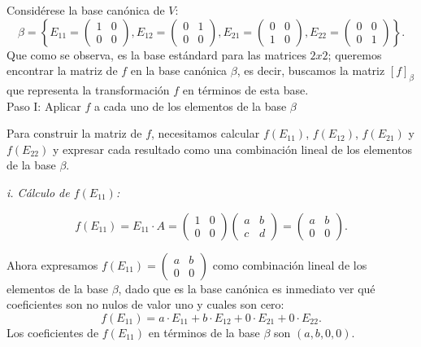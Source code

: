 \documentclass{article}
\begin{document}
Considérese la base canónica de \( V \):
\[
\beta = \left\{ E_{11} = \begin{pmatrix} 1 & 0 \\ 0 & 0 \end{pmatrix}, E_{12} = \begin{pmatrix} 0 & 1 \\ 0 & 0 \end{pmatrix}, E_{21} = \begin{pmatrix} 0 & 0 \\ 1 & 0 \end{pmatrix}, E_{22} = \begin{pmatrix} 0 & 0 \\ 0 & 1 \end{pmatrix} \right\}.
\]
Que como se observa, es la base estándard para las matrices $2x2$; queremos encontrar la matriz de \( f \) en la base canónica \( \beta \), es decir, buscamos la matriz \( [f]_\beta \) que representa la transformación \( f \) en términos de esta base.\\

Paso I: Aplicar \( f \) a cada uno de los elementos de la base \( \beta \)

Para construir la matriz de \( f \), necesitamos calcular \( f(E_{11}) \), \( f(E_{12}) \), \( f(E_{21}) \) y \( f(E_{22}) \) y expresar cada resultado como una combinación lineal de los elementos de la base \( \beta \).

\textit{i. Cálculo de \( f(E_{11}) \):}

   \[
   f(E_{11}) = E_{11} \cdot A = \begin{pmatrix} 1 & 0 \\ 0 & 0 \end{pmatrix} \begin{pmatrix} a & b \\ c & d \end{pmatrix} = \begin{pmatrix} a & b \\ 0 & 0 \end{pmatrix}.
   \]

   Ahora expresamos \( f(E_{11}) = \begin{pmatrix} a & b \\ 0 & 0 \end{pmatrix} \) como combinación lineal de los elementos de la base \( \beta \), dado que es la base canónica es inmediato ver qué coeficientes son no nulos de valor uno y cuales son cero:
   \[
   f(E_{11}) = a \cdot E_{11} + b \cdot E_{12} + 0 \cdot E_{21} + 0 \cdot E_{22}.
   \]
   Los coeficientes de \( f(E_{11}) \) en términos de la base \( \beta \) son \( (a, b, 0, 0) \).
\end{document}
